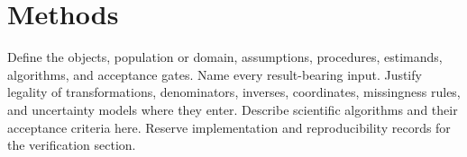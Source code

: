 \section{Methods}

Define the objects, population or domain, assumptions, procedures, estimands,
algorithms, and acceptance gates. Name every result-bearing input. Justify
legality of transformations, denominators, inverses, coordinates, missingness
rules, and uncertainty models where they enter. Describe scientific algorithms
and their acceptance criteria here. Reserve implementation and reproducibility
records for the verification section.
